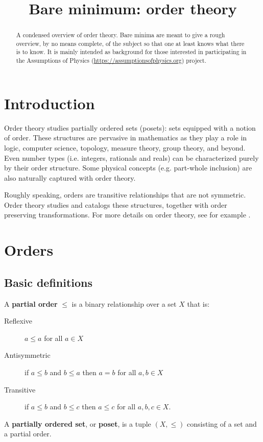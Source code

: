 \documentclass{article}
\title{Bare minimum: order theory}
\date{\vspace{-5ex}}
\newcommand{\marginleft}[1] {\reversemarginpar\marginpar{#1}}
\begin{document}
\maketitle

\begin{abstract}
	A condensed overview of order theory. Bare minima are meant to give a rough overview, by no means complete, of the subject so that one at least knows what there is to know. It is mainly intended as background for those interested in participating in the Assumptions of Physics (\url{https://assumptionsofphysics.org}) project.
\end{abstract}

\section{Introduction}

Order theory studies partially ordered sets (posets): sets equipped with a notion of order. These structures are pervasive in mathematics as they play a role in logic, computer science, topology, measure theory, group theory, and beyond. Even number types (i.e. integers, rationals and reals) can be characterized purely by their order structure. Some physical concepts (e.g. part-whole inclusion) are also naturally captured with order theory.

Roughly speaking, orders are transitive relationships that are not symmetric. Order theory studies and catalogs these structures, together with order preserving transformations. For more details on order theory, see for example \cite{davey2002introduction, pinter2014book}.

\section{Orders}

\subsection{Basic definitions}

\begin{defn}
	A \textbf{partial order} \marginleft{Partial order, poset: $(X, \leq)$} $\leq$ is a binary relationship over a set $X$ that is:
	\begin{description}
		\item[Reflexive] $a \leq a$ for all $a \in X$
		\item[Antisymmetric] if $a \leq b$ and $b \leq a$ then $a = b$ for all $a, b \in X$
		\item[Transitive] if $a \leq b$ and $b \leq c$ then $a \leq c$ for all $a, b, c \in X$.
	\end{description}
	A \textbf{partially ordered set}, or \textbf{poset}, is a tuple $(X, \leq)$ consisting of a set and a partial order.
\end{defn}
\end{document}
